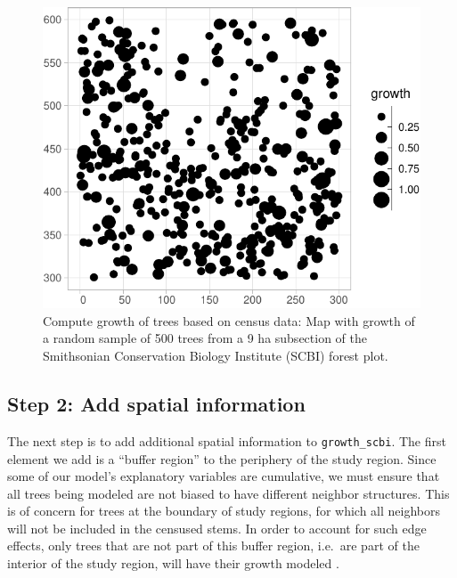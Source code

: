 \documentclass[12pt]{article}
\newenvironment{Shaded}{\begin{snugshade}}{\end{snugshade}}
\newcommand{\DataTypeTok}[1]{\textcolor[rgb]{0.13,0.29,0.53}{#1}}
\newcommand{\DecValTok}[1]{\textcolor[rgb]{0.00,0.00,0.81}{#1}}
\newcommand{\FloatTok}[1]{\textcolor[rgb]{0.00,0.00,0.81}{#1}}
\newcommand{\KeywordTok}[1]{\textcolor[rgb]{0.13,0.29,0.53}{\textbf{#1}}}
\newcommand{\NormalTok}[1]{#1}
\newcommand{\OperatorTok}[1]{\textcolor[rgb]{0.81,0.36,0.00}{\textbf{#1}}}
\newcommand{\StringTok}[1]{\textcolor[rgb]{0.31,0.60,0.02}{#1}}
\begin{document}
\begin{Shaded}
\end{Shaded}

\begin{figure}

{\centering \includegraphics[width=0.66\linewidth]{Figures/scbi-trees-1} 

}

\caption{Compute growth of trees based on census data: Map with growth of a random sample of 500 trees from a 9 ha subsection of the Smithsonian Conservation Biology Institute (SCBI) forest plot.}\label{fig:scbi-trees}
\end{figure}

\hypertarget{spatial-information}{%
\subsection{Step 2: Add spatial information}\label{spatial-information}}

The next step is to add additional spatial information to
\texttt{growth\_scbi}. The first element we add is a ``buffer region''
to the periphery of the study region. Since some of our model's
explanatory variables are cumulative, we must ensure that all trees
being modeled are not biased to have different neighbor structures. This
is of concern for trees at the boundary of study regions, for which all
neighbors will not be included in the censused stems. In order to
account for such edge effects, only trees that are not part of this
buffer region, i.e.~are part of the interior of the study region, will
have their growth modeled \citep{waller_applied_2004}.
\end{document}
